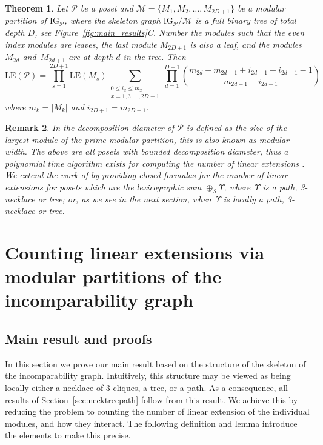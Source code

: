 \documentclass[9pt,a4paper,oneside]{article}
\newtheorem{theorem}{Theorem}
\newtheorem{remark}[theorem]{Remark}
\newcommand{\cM}{\mathcal{M}}
\newcommand{\cP}{\mathcal{P}}
\newcommand{\cS}{\mathcal{S}}
\newcommand{\IG}{\mathrm{IG}}
\newcommand{\lex}{\mathrm{LE}}
\begin{document}
\begin{theorem}\label{thm:tree}
Let $\cP$ be a poset and $\cM=\{M_1,M_2,\ldots,M_{2D+1}\}$ be a modular partition of $\IG_\cP$, where 
the skeleton graph $\IG_\cP/\cM$ is a full binary tree of total depth $D$, see Figure~\ref{fig:main_results}C. Number the modules such that the even index modules are leaves, the last module $M_{2D+1}$ is also a leaf, and 
the modules $M_{2d}$ and~$M_{2d+1}$ are at depth $d$ in the tree.
Then
	$$ \lex(\mathcal{P})=\prod_{s=1}^{2D+1}
 \lex(M_s) \sum_{\substack{0\le i_x\le m_x\\x=1,3,\ldots, 2D-1}}
	\prod_{d=1}^{D-1} \binom{m_{2d}+m_{2d-1}+i_{2d+1}-i_{2d-1}-1}{m_{2d-1}-i_{2d-1}} $$
	where $m_k=|M_k|$ and $i_{2D+1}=m_{2D+1}$.
\end{theorem}


 
\begin{remark}
In \cite{Hab87} the \emph{decomposition diameter} of $\cP$ is defined as the size of the largest module of the prime modular partition, this is also known as \emph{modular width}.
The above are all posets with bounded decomposition diameter, thus a polynomial time algorithm exists for computing the number of linear extensions \cite[Proposition 3.4]{Hab87}. 
 We extend the work of \cite{Hab87} by providing closed formulas for the number of linear extensions for posets which are the lexicographic sum $\oplus_\cS \Upsilon$, where~$\Upsilon$
 is a path, 3-necklace or tree; or, as we see in the next section, when~$\Upsilon$ is locally a path, 3-necklace or tree.
\end{remark}
 



\section{Counting linear extensions via modular partitions of the incomparability graph}
\subsection{Main result and proofs}

In this section we prove our main result based on the structure of the skeleton of the incomparability graph. Intuitively, this structure may be viewed as being locally either a necklace of $3$-cliques, a tree, or a path. As a consequence, all results of Section~\ref{sec:necktreepath} follow from this result.  We achieve this by reducing the problem to counting the number of linear extension of the individual modules, and how they interact.  The following definition and lemma introduce the elements to make this precise.
\end{document}
